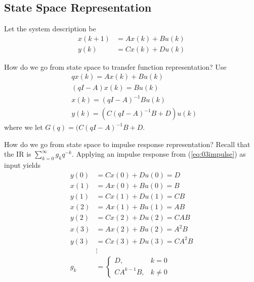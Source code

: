 \documentclass[lecture,12pt,]{pcms-l}
\theoremstyle{example}
\begin{document}
\subsection{State Space Representation}
Let the system description be
\begin{align*}
x(k+1) &= Ax(k) + Bu(k) \\
y(k) &= Cx(k) + Du(k)
\end{align*}

How do we go from state space to transfer function representation? Use
\begin{align*}
&qx(k) = Ax(k) + Bu(k) \\
&(qI-A)x(k) = Bu(k) \\
&x(k) = (qI-A)^{-1}Bu(k) \\
&y(k) = (C(qI-A)^{-1}B+D)u(k)
\end{align*}
where we let $G(q) = (C(qI-A)^{-1}B+D$.

How do we go from state space to impulse response representation? Recall that the IR is $\sum_{k=0}^\infty g_kq^{-k}$. Applying an impulse response from (\ref{eq:03impulse}) as input yields
\begin{align*}
y(0) &= Cx(0) + Du(0) = D \\
x(1) &= Ax(0) + Bu(0) = B \\
y(1) &= Cx(1) + Du(1) = CB \\
x(2) &= Ax(1) + Bu(1) = AB \\
y(2) &= Cx(2) + Du(2) = CAB \\
x(3) &= Ax(2) + Bu(2) = A^2B \\
y(3) &= Cx(3) + Du(3) = CA^2B \\
&\vdots \\
g_k &= \begin{cases} D, & k=0 \\ CA^{k-1}B, & k\neq 0 \end{cases}
\end{align*}
\end{document}
